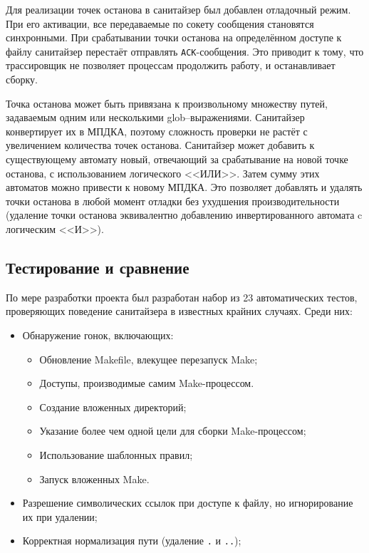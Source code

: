Для реализации точек останова в санитайзер был добавлен отладочный режим. При его активации, все передаваемые по сокету сообщения становятся синхронными. При срабатывании точки останова на определённом доступе к файлу санитайзер перестаёт отправлять \texttt{ACK}-сообщения. Это приводит к тому, что трассировщик не позволяет процессам продолжить работу, и останавливает сборку.

Точка останова может быть привязана к произвольному множеству путей, задаваемым одним или несколькими glob--выражениями. Санитайзер конвертирует их в МПДКА, поэтому сложность проверки не растёт с увеличением количества точек останова. Санитайзер может добавить к существующему автомату новый, отвечающий за срабатывание на новой точке останова, с использованием логического <<ИЛИ>>. Затем сумму этих автоматов можно привести к новому МПДКА. Это позволяет добавлять и удалять точки останова в любой момент отладки без ухудшения производительности (удаление точки останова эквивалентно добавлению инвертированного автомата c логическим <<И>>).

\subsection{Тестирование и сравнение}
\label{subsec:testing}

По мере разработки проекта был разработан набор из 23 автоматических тестов, проверяющих поведение санитайзера в известных крайних случаях. Среди них:

\begin{itemize}
    \item Обнаружение гонок, включающих:
    \begin{itemize}
        \item Обновление Makefile, влекущее перезапуск Make;
        \item Доступы, производимые самим Make-процессом.
        \item Создание вложенных директорий;
        \item Указание более чем одной цели для сборки Make-процессом;
        \item Использование шаблонных правил;
        \item Запуск вложенных Make.
    \end{itemize}
    \item Разрешение символических ссылок при доступе к файлу, но игнорирование их при удалении;
    \item Корректная нормализация пути (удаление \texttt{.} и \texttt{..});
\end{itemize}

